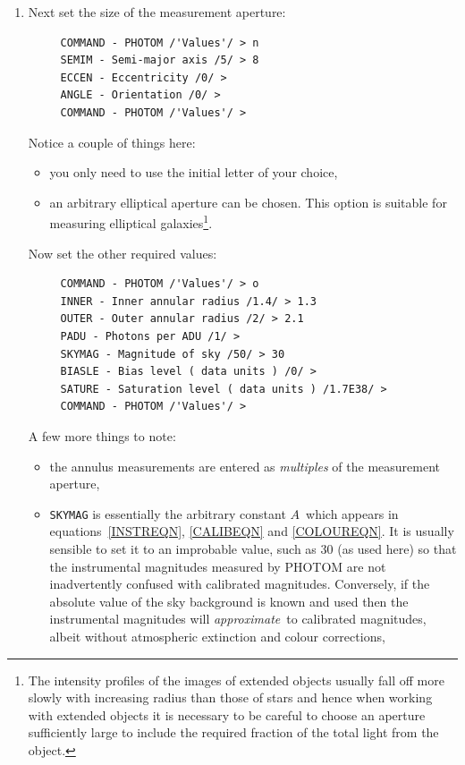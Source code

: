 \documentclass[twoside,11pt]{article}
\begin{document}
\begin{enumerate}
  \item Next set the size of the measurement aperture:

{\samepage
\begin{verbatim}
     COMMAND - PHOTOM /'Values'/ > n
     SEMIM - Semi-major axis /5/ > 8
     ECCEN - Eccentricity /0/ >
     ANGLE - Orientation /0/ >
     COMMAND - PHOTOM /'Values'/ >
\end{verbatim}
}

   Notice a couple of things here:

  \begin{itemize}

    \item you only need to use the initial letter of your choice,

    \item an arbitrary elliptical aperture can be chosen. This option is
     suitable for measuring elliptical galaxies\footnote{The intensity
     profiles of the images of extended objects usually fall off more
     slowly with increasing radius than those of stars and hence when
     working with extended objects it is necessary to be careful to choose
     an aperture sufficiently large to include the required fraction of the
     total light from the object.}.

\end{itemize}

   Now set the other required values:

\begin{verbatim}
     COMMAND - PHOTOM /'Values'/ > o
     INNER - Inner annular radius /1.4/ > 1.3
     OUTER - Outer annular radius /2/ > 2.1
     PADU - Photons per ADU /1/ >
     SKYMAG - Magnitude of sky /50/ > 30
     BIASLE - Bias level ( data units ) /0/ >
     SATURE - Saturation level ( data units ) /1.7E38/ >
     COMMAND - PHOTOM /'Values'/ >
\end{verbatim}

   A few more things to note:

  \begin{itemize}

    \item the annulus measurements are entered as {\it multiples} of the
     measurement aperture,

    \item {\tt SKYMAG} is essentially the arbitrary constant $A$\,
     which appears in equations~\ref{INSTREQN}, \ref{CALIBEQN} and
     \ref{COLOUREQN}.  It is usually sensible to set it to an
     improbable value, such as 30 (as used here) so that the
     instrumental magnitudes measured by PHOTOM are not inadvertently
     confused with calibrated magnitudes.  Conversely, if the absolute
     value of the sky background is known and used then the instrumental
     magnitudes will {\it approximate}\, to calibrated magnitudes,
     albeit without atmospheric extinction and colour corrections,


\end{itemize}
\end{enumerate}
\end{document}
